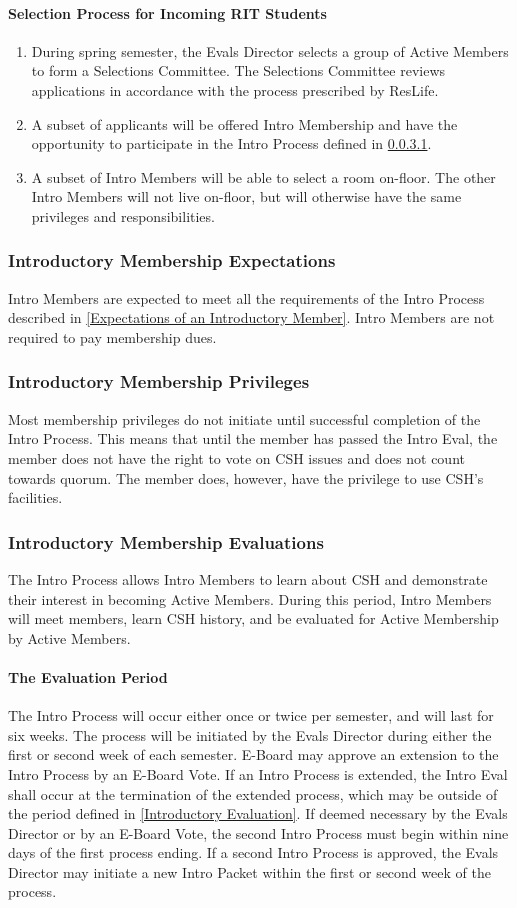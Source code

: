 \documentclass{article}
\newcommand{\asubsection}[1]{\subsubsection{#1} \label{#1}}
\newcommand{\asubsubsection}[1]{\paragraph{#1} \label{#1}}
\begin{document}
\asubsubsection{Selection Process for Incoming RIT Students}
\begin{enumerate}
	\item During spring semester, the Evals Director selects a group of Active Members to form a Selections Committee.
	      The Selections Committee reviews applications in accordance with the process prescribed by ResLife.
	\item A subset of applicants will be offered Intro Membership and have the opportunity to participate in the Intro Process defined in \ref{The Evaluation Period}.
	\item A subset of Intro Members will be able to select a room on-floor. The other Intro Members will not live on-floor, but will otherwise have the same privileges and responsibilities.
\end{enumerate}

\asubsection{Introductory Membership Expectations}
Intro Members are expected to meet all the requirements of the Intro Process described in \ref{Expectations of an Introductory Member}.
Intro Members are not required to pay membership dues.

\asubsection{Introductory Membership Privileges}
Most membership privileges do not initiate until successful completion of the Intro Process.
This means that until the member has passed the Intro Eval, the member does not have the right to vote on CSH issues and does not count towards quorum.
The member does, however, have the privilege to use CSH's facilities.

\asubsection{Introductory Membership Evaluations}
The Intro Process allows Intro Members to learn about CSH and demonstrate their interest in becoming Active Members. During this period, Intro Members will meet members, learn CSH history, and be evaluated for Active Membership by Active Members.

\asubsubsection{The Evaluation Period}
The Intro Process will occur either once or twice per semester, and will last for six weeks.
The process will be initiated by the Evals Director during either the first or second week of each semester. E-Board may approve an extension to the Intro Process by an E-Board Vote.
If an Intro Process is extended, the Intro Eval shall occur at the termination of the extended process, which may be outside of the period defined in \ref{Introductory Evaluation}.
If deemed necessary by the Evals Director or by an E-Board Vote, the second Intro Process must begin within nine days of the first process ending.
If a second Intro Process is approved, the Evals Director may initiate a new Intro Packet within the first or second week of the process.
\end{document}
